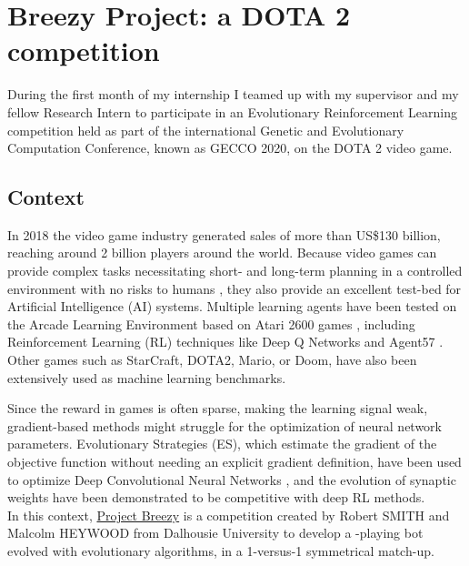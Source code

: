 \chapter{Breezy Project: a DOTA 2 competition}
\label{chap:dota}

During the first month of my internship I teamed up with my supervisor \href{https://www.linkedin.com/in/dennis-g-wilson/}{\color{blue}{Assoc. Prof. Dennis Wilson}} and my fellow Research Intern \href{https://www.linkedin.com/in/lucashervier/}{\color{blue}{Lucas Hervier}} to participate in an Evolutionary Reinforcement Learning competition held as part of the international Genetic and Evolutionary Computation Conference, known as GECCO 2020, on the DOTA 2 video game.

\section{Context}
In 2018 the video game industry generated sales of more than US\$130 billion, reaching around 2 billion players around the world. Because video games can provide complex tasks necessitating short- and long-term planning in a controlled environment with no risks to humans \cite{Games_AI}, they also provide an excellent test-bed for Artificial Intelligence (AI) systems. Multiple learning agents have been tested on the Arcade Learning Environment based on Atari 2600 games \cite{Atari}, including Reinforcement Learning (RL) techniques like Deep Q Networks \cite{DQN} and Agent57 \cite{agent57}. Other games such as StarCraft, DOTA2, Mario, or Doom, have also been extensively used as machine learning benchmarks.

Since the reward in games is often sparse, making the learning signal weak, gradient-based methods might struggle for the optimization of neural network parameters. Evolutionary Strategies (ES), which estimate the gradient of the objective function without needing an explicit gradient definition, have been used to optimize Deep Convolutional Neural Networks \cite{CMAES_DL}, and the evolution of synaptic weights have been demonstrated to be competitive with deep RL methods\cite{deep_neuroevo}.\\

In this context, \href{https://web.cs.dal.ca/~dota2/?page_id=353}{\color{blue} {Project Breezy}} is a competition created by Robert SMITH and Malcolm HEYWOOD from Dalhousie University to develop a \href{https://store.steampowered.com/app/570/Dota_2/}{\color{blue}{DOTA 2}}-playing bot evolved with evolutionary algorithms, in a 1-versus-1 symmetrical match-up. 

